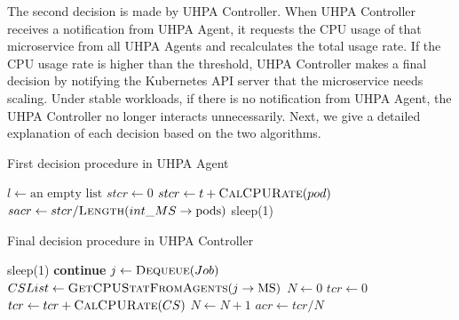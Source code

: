 \documentclass[conference]{IEEEtran}
\begin{document}
The second decision is made by UHPA Controller. When UHPA Controller receives a notification from UHPA Agent, it requests the CPU usage of that microservice from all UHPA Agents and recalculates the total usage rate. If the CPU usage rate is higher than the threshold, UHPA Controller makes a final decision by notifying the Kubernetes API server that the microservice needs scaling.
Under stable workloads, if there is no notification from UHPA Agent, the UHPA Controller no longer interacts unnecessarily. Next, we give a detailed explanation of each decision based on the two algorithms. \\

\begin{algorithm}[tb]
    \caption{First decision procedure in UHPA Agent}
    \begin{algorithmic}[1]
        \State $l \gets \text{an empty list}$
        \State $stcr \gets 0$
        \State $stcr \gets t + \Call{CalCPURate}{pod}$
        \EndFor
        \State $sacr \gets stcr / \Call{Length}{int\_MS\rightarrow\text{pods}}$
        \State {}
        \EndIf
        \EndFor
        \State {}
        \EndIf
        \State sleep(1)
        \EndWhile
    \end{algorithmic}
    \label{alg:agent}
\end{algorithm}

\begin{algorithm}[tb]
    \caption{Final decision procedure in UHPA Controller}
    \begin{algorithmic}[1]
        \State sleep(1)
        \State \textbf{continue}
        \EndIf
        \State $j \gets \Call{Dequeue}{Job}$
        \State $CSList \gets \Call{GetCPUStatFromAgents}{j\rightarrow\text{MS}}$
        \State $N \gets 0$
        \State $tcr \gets 0$
        \State $tcr \gets tcr + \Call{CalCPURate}{CS}$
        \State $N \gets N + 1$
        \EndIf
        \EndFor
        \State $acr \gets tcr / N$
        \State {}
        \EndIf
        \EndWhile
    \end{algorithmic}
    \label{alg:controller}
\end{algorithm}
\end{document}

